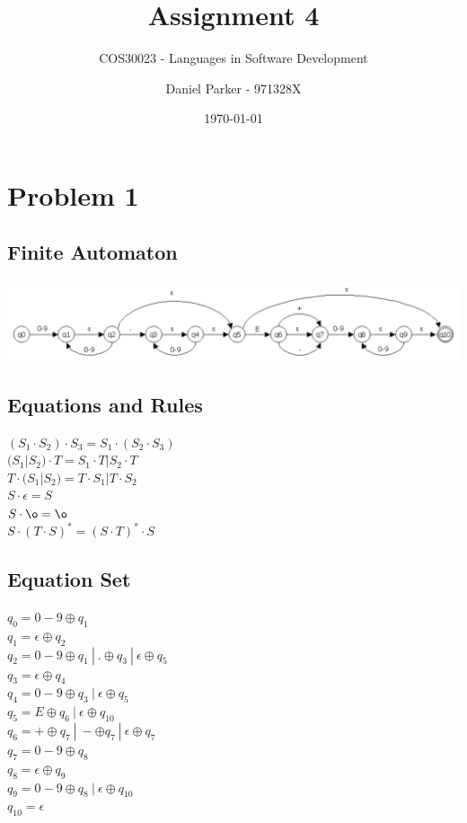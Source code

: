 \documentclass[11pt, numbers=endperiod, parskip=half]{scrartcl}
\title{Assignment 4}
\subtitle{COS30023 - Languages in Software Development}
\author{Daniel Parker - 971328X}
\date{\today}
\begin{document}
\maketitle

\section{Problem 1}
\subsection{Finite Automaton}
\includegraphics[scale=0.4]{automaton.png}

\subsection{Equations and Rules}
\((S_1 \cdot S_2 ) \cdot S_3 = S_1 \cdot (S_2 \cdot S_3)\)\\
\( (S_1 | S_2) \cdot T = S_1 \cdot T | S_2 \cdot T \)\\
\( T \cdot (S_1 | S_2) = T \cdot S_1 | T \cdot S_2 \)\\
\( S \cdot \epsilon = S \)\\
\( S \cdot \o = \o\)\\
\( S \cdot ( T \cdot S )^* = (S \cdot T)^* \cdot S \)

\subsection{Equation Set}
\(q_0 = 0-9 \oplus q_1\)\\
\(q_1 = \epsilon \oplus q_2\)\\
\(q_2 = 0-9 \oplus q_1\ |\ . \oplus q_3\ |\ \epsilon \oplus q_5 \)\\
\(q_3 = \epsilon \oplus q_4\)\\
\(q_4 = 0-9 \oplus q_3\ |\ \epsilon \oplus q_5\)\\
\(q_5 = E \oplus q_6\ |\ \epsilon \oplus q_{10}\)\\
\(q_6 = + \oplus q_7\ |\ - \oplus q_7\ |\ \epsilon \oplus q_7\)\\
\(q_7 = 0-9 \oplus q_8\)\\
\(q_8 = \epsilon \oplus q_9\)\\
\(q_9 = 0-9 \oplus q_8\ |\ \epsilon \oplus q_{10}\)\\
\(q_{10} = \epsilon\)
\end{document}

